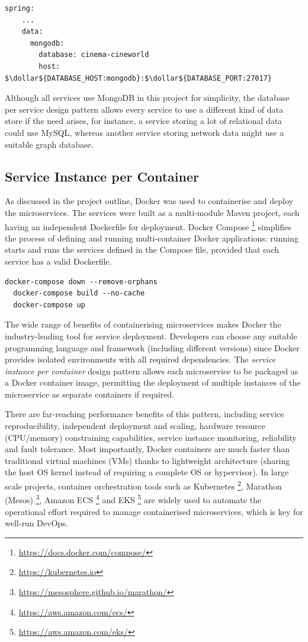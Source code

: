 \begin{lstlisting}[caption=Snippet from Cineworld cinema's application properties.]
  spring:
    ...
    data:
      mongodb:
        database: cinema-cineworld
        host: $\dollar${DATABASE_HOST:mongodb}:$\dollar${DATABASE_PORT:27017}
\end{lstlisting}

Although all services use MongoDB in this project for simplicity, the database per service design pattern allows every service to use a different kind of data store if the need arises, for instance, a service storing a lot of relational data could use MySQL, whereas another service storing network data might use a suitable graph database.

\subsection{Service Instance per Container}

As discussed in the project outline, Docker was used to containerise and deploy the microservices. The services were built as a multi-module Maven project, each having an independent Dockerfile for deployment. Docker Compose \footnote{\url{https://docs.docker.com/compose/}} simplifies the process of defining and running multi-container Docker applications: running  starts and runs the services defined in the Compose file, provided that each service has a valid Dockerfile.

\begin{lstlisting}[caption=Sample Docker Compose commands to start the microservices.]
  docker-compose down --remove-orphans
  docker-compose build --no-cache
  docker-compose up
\end{lstlisting}

The wide range of benefits of containerising microservices makes Docker the industry-leading tool for service deployment. Developers can choose any suitable programming language and framework (including different versions) since Docker provides isolated environments with all required dependencies. The \textit{service instance per container} design pattern allows each microservice to be packaged as a Docker container image, permitting the deployment of multiple instances of the microservice as separate containers if required.

There are far-reaching performance benefits of this pattern, including service reproducibility, independent deployment and scaling, hardware resource (CPU/memory) constraining capabilities, service instance monitoring, reliability and fault tolerance. Most importantly, Docker containers are much faster than traditional virtual machines (VMs) thanks to lightweight architecture (sharing the host OS kernel instead of requiring a complete OS or hypervisor). In large scale projects, container orchestration tools such as Kubernetes \footnote{\url{https://kubernetes.io}}, Marathon (Mesos) \footnote{\url{https://mesosphere.github.io/marathon/}}, Amazon ECS \footnote{\url{https://aws.amazon.com/ecs/}} and EKS \footnote{\url{https://aws.amazon.com/eks/}} are widely used to automate the operational effort required to manage containerised microservices, which is key for well-run DevOps.

